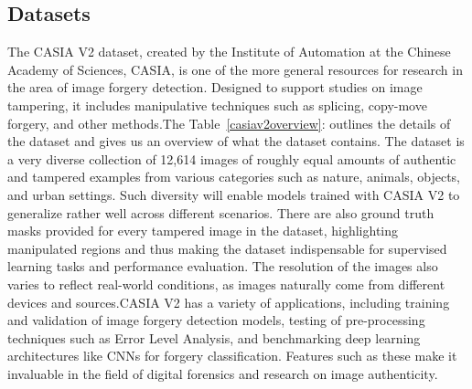 \documentclass{ieeeaccess}
\begin{document}
\subsection{Datasets}
	The CASIA V2 dataset, created by the Institute of Automation at the Chinese Academy of Sciences, CASIA, is one of the more general resources for research in the area of image forgery detection. Designed to support studies on image tampering, it includes manipulative techniques such as splicing, copy-move forgery, and other methods.The Table~\ref{casiav2overview}: outlines the details of the dataset and gives us an overview of what the dataset contains. The dataset is a very diverse collection of 12,614 images of roughly equal amounts of authentic and tampered examples from various categories such as nature, animals, objects, and urban settings. Such diversity will enable models trained with CASIA V2 to generalize rather well across different scenarios. There are also ground truth masks provided for every tampered image in the dataset, highlighting manipulated regions and thus making the dataset indispensable for supervised learning tasks and performance evaluation. The resolution of the images also varies to reflect real-world conditions, as images naturally come from different devices and sources.CASIA V2 has a variety of applications, including training and validation of image forgery detection models, testing of pre-processing techniques such as Error Level Analysis, and benchmarking deep learning architectures like CNNs for forgery classification. Features such as these make it invaluable in the field of digital forensics and research on image authenticity.
\end{document}

